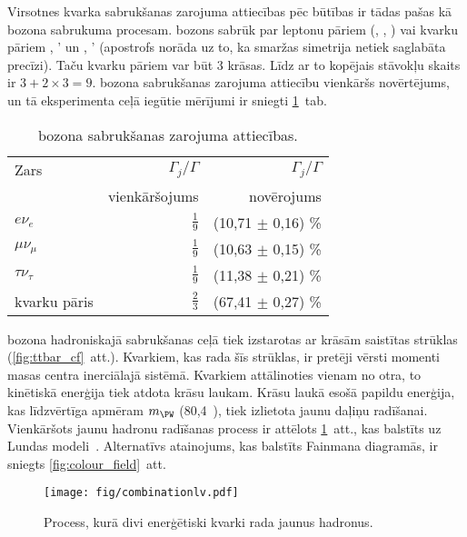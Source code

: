 Virsotnes kvarka sabrukšanas zarojuma attiecības pēc būtības ir tādas pašas kā \PW bozona sabrukuma procesam. \PW bozons sabrūk par leptonu pāriem (\Pe\Pgne, \Pgm\Pgngm, \Pgt\Pgngt) vai kvarku pāriem \cPqu, \cPqd' un \cPqc, \cPqs' (apostrofs norāda uz to, ka smaržas simetrija netiek saglabāta precīzi). Taču kvarku pāriem var būt 3 krāsas. Līdz ar to kopējais stāvokļu skaits ir $3+2\times3=9$. \PW bozona sabrukšanas zarojuma attiecību vienkāršs novērtējums, un tā eksperimenta ceļā iegūtie mērījumi ir sniegti \ref{tab:W_br}~tab.

\begin{table}[h!]
  \centering
  \caption{\PW bozona sabrukšanas zarojuma attiecības.}
  \label{tab:W_br}
  \begin{tabular}{l r r}
    Zars                  & $\Gamma_{j}/\Gamma$ & $\Gamma_{j}/\Gamma$\\
                          & vienkāršojums       & novērojums \cite{Patrignani:2016xqp}\\
    \hline
    $e\nu_{e}$            & $\frac{1}{9}$       & (10,71 $\pm$ 0,16) \%\\
    $\mu\nu_{\mu}$        & $\frac{1}{9}$       & (10,63 $\pm$ 0,15) \%\\
    $\tau\nu_{\tau}$      & $\frac{1}{9}$       & (11,38 $\pm$ 0,21) \%\\
    kvarku pāris          & $\frac{2}{3}$       & (67,41 $\pm$ 0,27) \%
  \end{tabular}
\end{table}

\PW bozona hadroniskajā sabrukšanas ceļā tiek izstarotas ar krāsām saistītas strūklas (\ref{fig:ttbar_cf}~att.). Kvarkiem, kas rada šīs strūklas, ir pretēji vērsti momenti masas centra inerciālajā sistēmā. Kvarkiem attālinoties vienam no otra, to kinētiskā enerģija tiek atdota krāsu laukam. Krāsu laukā esošā papildu enerģija, kas līdzvērtīga apmēram $m_{\PW}$ (80,4~\GeV), tiek izlietota jaunu daļiņu radīšanai. Vienkāršots jaunu hadronu radīšanas process ir attēlots \ref{fig:combination}~att., kas balstīts uz Lundas modeli~\cite{Andersson:1983ia}. Alternatīvs atainojums, kas balstīts Fainmana diagramās, ir sniegts \ref{fig:colour_field}~att.

\begin{figure}[htp]
  \centering
  \texttt{[image: fig/combinationlv.pdf]}
  \caption{Process, kurā divi enerģētiski kvarki rada jaunus hadronus.}
  \label{fig:combination}
\end{figure}

